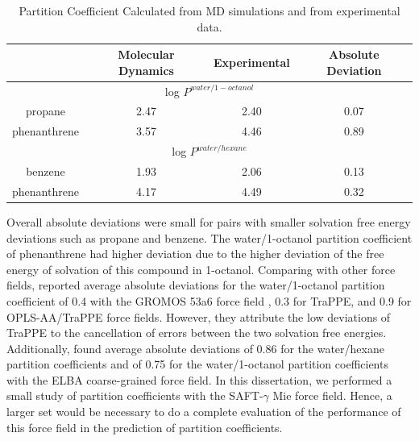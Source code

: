 \begin{table}[H]
	\centering
	\caption{Partition Coefficient Calculated from MD simulations and from experimental data.}
	\label{tbl:part}
	\begin{tabular}{cccc}
		\hline\hline
		& {Molecular Dynamics} & {Experimental} & Absolute Deviation \\ \hline
		\multicolumn{4}{c}{log $P^{water/1-octanol}$}               \\ \hline
		propane      & 2.47                 & 2.40           & 0.07               \\
		phenanthrene & 3.57                 & 4.46           & 0.89               \\ \hline
		\multicolumn{4}{c}{log $P^{water/hexane}$}                 \\ \hline
		benzene      & 1.93                 & 2.06           & 0.13               \\
		phenanthrene & 4.17                 & 4.49           & 0.32               \\
		\hline\hline
	\end{tabular}
	
\end{table}

Overall absolute deviations were small for pairs with smaller solvation free energy deviations such as propane and benzene. The water/1-octanol partition coefficient of phenanthrene had higher deviation due to the higher deviation of the free energy of solvation of this compound in 1-octanol. Comparing with other force fields,  reported average absolute deviations for the water/1-octanol partition coefficient of 0.4 with the GROMOS 53a6 force field \cite{JCC:JCC20090}, 0.3 for TraPPE, and 0.9 for OPLS-AA/TraPPE force fields. However, they attribute the low deviations of TraPPE to the cancellation of errors between the two solvation free energies. Additionally,  found average absolute deviations of 0.86 for the water/hexane partition coefficients and of 0.75 for the water/1-octanol partition coefficients with the ELBA coarse-grained force field. In this dissertation, we performed a small study of partition coefficients with the SAFT-$\gamma$ Mie force field. Hence, a larger set would be necessary to do a complete evaluation of the performance of this force field in the prediction of partition coefficients. 